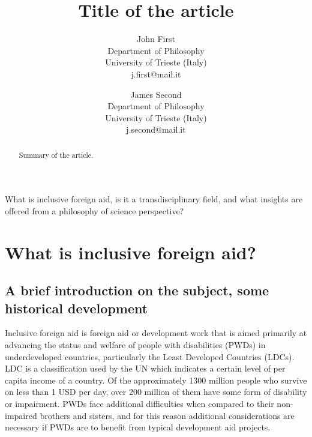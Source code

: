 \documentclass{lps}
\begin{document}
\title{Title of the article}
\author{John First\\Department of Philosophy\\University of Trieste (Italy)\\j.first@mail.it \and%
            James Second\\Department of Philosophy\\University of Trieste (Italy)\\j.second@mail.it}

\maketitle
\tableofcontents


\begin{abstract}
Summary of the article.
\end{abstract}



What is inclusive foreign aid, is it a transdisciplinary field, and what insights are offered from a philosophy of science perspective?

\section{What is inclusive foreign aid?}
\subsection{A brief introduction on the subject, some historical development}

Inclusive foreign aid is foreign aid or development work that is aimed primarily at advancing the status and welfare of people with disabilities (PWDs) in underdeveloped countries, particularly the Least Developed Countries (LDCs). LDC is a classification used by the UN which indicates a certain level of per capita income of a country. Of the approximately 1300 million people who survive on less than 1 USD per day, over 200 million of them have some form of disability or impairment. PWDs face additional difficulties when compared to their non-impaired brothers and sisters, and for this reason additional considerations are necessary if PWDs are to benefit from typical development aid projects. 
\end{document}

